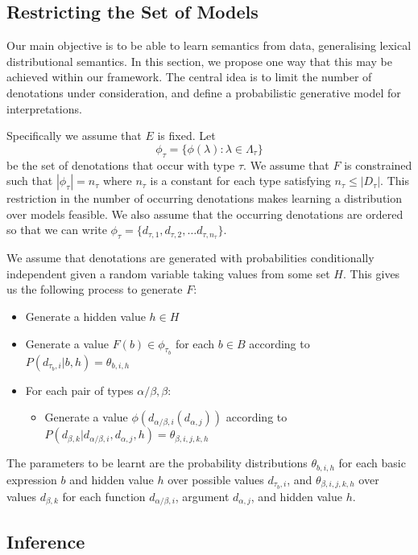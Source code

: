\documentclass{svmult}
\begin{document}
\subsection{Restricting the Set of Models}
\label{section:distributions}

Our main objective is to be able to learn semantics from data,
generalising lexical distributional semantics. In this section, we
propose one way that this may be achieved within our framework. The
central idea is to limit the number of denotations under
consideration, and define a probabilistic generative model for
interpretations.

Specifically we assume that $E$ is fixed. Let
$$\phi_\tau = \{\phi(\lambda) : \lambda\in \Lambda_\tau\}$$
be the set of denotations that occur with type $\tau$. We assume that
$F$ is constrained such that $|\phi_\tau| = n_\tau$ where $n_\tau$
is a constant for each type satisfying $n_\tau \le |D_\tau|$. This
restriction in the number of occurring denotations makes learning a
distribution over models feasible. We also assume that the occurring
denotations are ordered so that we can write $\phi_\tau =
\{d_{\tau,1}, d_{\tau,2}, \ldots d_{\tau, n_\tau}\}$.


We assume that denotations are generated with probabilities
conditionally independent given a random variable taking values from
some set $H$. This gives us the following process to generate $F$:
\begin{itemize}
\item Generate a hidden value $h\in H$
\item Generate a value $F(b) \in \phi_{\tau_b}$ for each $b\in B$ according to
  $P(d_{\tau_b,i}|b, h) = \theta_{b,i,h}$
\item For each pair of types $\alpha/\beta, \beta$:
\begin{itemize}
\item Generate a value $\phi(d_{\alpha/\beta,i}(d_{\alpha,j}))$
  according to $P(d_{\beta,k}|d_{\alpha/\beta,i}, d_{\alpha,j},h) = \theta_{\beta,i,j,k,h}$
\end{itemize}
\end{itemize}
The parameters to be learnt are the probability distributions
$\theta_{b,i,h}$ for each basic expression $b$ and hidden value $h$
over possible values $d_{\tau_b,i}$, and $\theta_{\beta,i,j,k,h}$ over
values $d_{\beta,k}$ for each function $d_{\alpha/\beta,i}$, argument
$d_{\alpha,j}$, and hidden value $h$.

\subsection{Inference}
\end{document}
